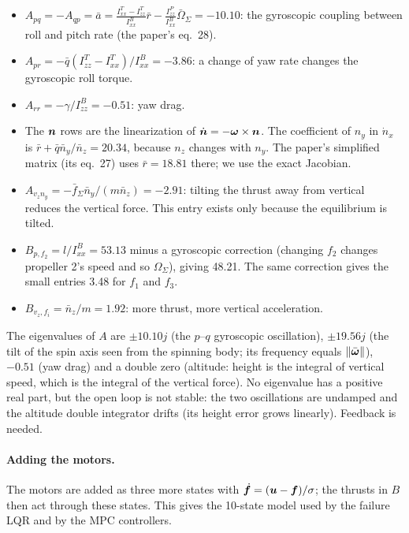 \begin{itemize}
  \item $A_{pq} = -A_{qp} = \bar a = \frac{I^T_{xx}-I^T_{zz}}{I^B_{xx}}\bar r - \frac{I^P_{zz}}{I^B_{xx}}\bar\Omega_\Sigma = -10.10$: the gyroscopic coupling between roll and pitch rate (the paper's eq.~28).
  \item $A_{pr} = -\bar q(I^T_{zz}-I^T_{xx})/I^B_{xx} = -3.86$: a change of yaw rate changes the gyroscopic roll torque.
  \item $A_{rr} = -\gamma/I^B_{zz} = -0.51$: yaw drag.
  \item The $\boldsymbol{n}$ rows are the linearization of $\dot{\boldsymbol{n}} = -\boldsymbol{\omega}\times\boldsymbol{n}$. The coefficient of $n_y$ in $\dot n_x$ is $\bar r + \bar q\bar n_y/\bar n_z = 20.34$, because $n_z$ changes with $n_y$. The paper's simplified matrix (its eq.~27) uses $\bar r = 18.81$ there; we use the exact Jacobian.
  \item $A_{v_z n_y} = -\bar f_\Sigma\bar n_y/(m\bar n_z) = -2.91$: tilting the thrust away from vertical reduces the vertical force. This entry exists only because the equilibrium is tilted.
  \item $B_{p,f_2} = l/I^B_{xx} = 53.13$ minus a gyroscopic correction (changing $f_2$ changes propeller 2's speed and so $\Omega_\Sigma$), giving 48.21. The same correction gives the small entries 3.48 for $f_1$ and $f_3$.
  \item $B_{v_z,f_i} = \bar n_z/m = 1.92$: more thrust, more vertical acceleration.
\end{itemize}
The eigenvalues of $A$ are $\pm10.10j$ (the $p$--$q$ gyroscopic oscillation), $\pm19.56j$ (the tilt of the spin axis seen from the spinning body; its frequency equals $\|\bar{\boldsymbol{\omega}}\|$), $-0.51$ (yaw drag) and a double zero (altitude: height is the integral of vertical speed, which is the integral of the vertical force). No eigenvalue has a positive real part, but the open loop is not stable: the two oscillations are undamped and the altitude double integrator drifts (its height error grows linearly). Feedback is needed.

\paragraph{Adding the motors.} The motors are added as three more states with $\dot{\boldsymbol{f}} = (\boldsymbol{u} - \boldsymbol{f})/\sigma$; the thrusts in $B$ then act through these states. This gives the 10-state model used by the failure LQR and by the MPC controllers.

